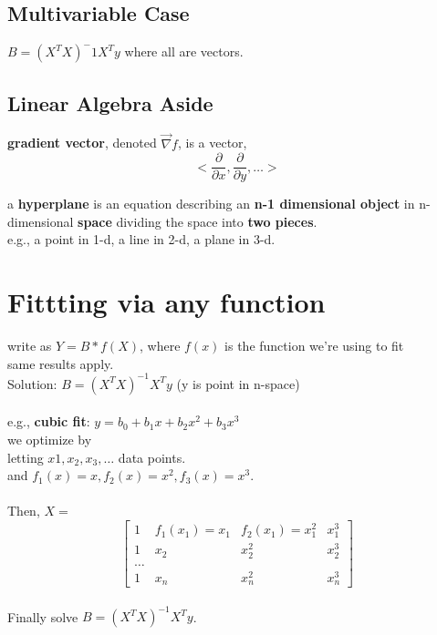 \documentclass[12pt]{article}
\newcommand{\bt}[1]{\textbf{#1}} %
\begin{document}
\subsection*{Multivariable Case}
$B = (X^T X)^-1 X^T y$
where all are vectors.


\subsection*{Linear Algebra Aside}
\bt{gradient vector}, denoted $\vec\nabla f$, is a vector, 
$$<\frac{\partial}{\partial x}, \frac{\partial}{\partial y}, \dots>$$


a \bt{hyperplane} is an equation describing an \bt{n-1 dimensional object} in n-dimensional \bt{space} dividing the space into \bt{two pieces}.\\

e.g., a point in 1-d,  a line in 2-d, a plane in 3-d.

\section*{Fittting via any function}

write as $Y = B * f(X)$, where $f(x)$ is the function we're using to fit\\

same results apply.\\
Solution: $B = (X^T X)^{-1} X^T y$ (y is point in n-space)\\
\ \\

e.g., \bt{cubic fit}: $y = b_0 + b_1 x + b_2 x^2 + b_3 x^3$\\
we optimize by \\
letting $x1, x_2, x_3, \dots$ data points.\\
and $f_1(x) = x, f_2(x) = x^2, f_3(x) =x^3$.\\
\ \\
Then, 
$X =$ 
\begin{equation}
\begin{bmatrix}
    1 & f_1(x_1) = x_1 & f_2(x_1) = x_1^2 & x_1^3 \\
    1 & x_2 & x_2^2 & x_2^3 \\
    \dots \\
    1 & x_n & x_n^2 & x_n^3
\end{bmatrix}
\end{equation}
\ \\

Finally solve $B = (X^T X)^{-1} X^T y$. 
\end{document}
